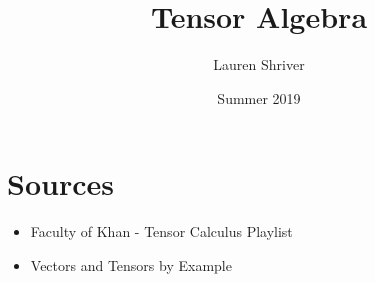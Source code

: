\documentclass[a4paper]{article}
\title{Tensor Algebra}
\author{Lauren Shriver}
\date{Summer 2019}
\begin{document}
\maketitle

\section*{Sources}
\begin{itemize}
    \item Faculty of Khan - Tensor Calculus Playlist
    \item Vectors and Tensors by Example
\end{itemize}
\end{document}
